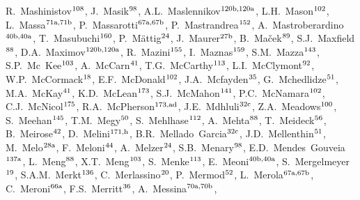 \begin{flushleft}
R.~Mashinistov$^\textrm{\scriptsize 108}$,    
J.~Masik$^\textrm{\scriptsize 98}$,    
A.L.~Maslennikov$^\textrm{\scriptsize 120b,120a}$,    
L.H.~Mason$^\textrm{\scriptsize 102}$,    
L.~Massa$^\textrm{\scriptsize 71a,71b}$,    
P.~Massarotti$^\textrm{\scriptsize 67a,67b}$,    
P.~Mastrandrea$^\textrm{\scriptsize 152}$,    
A.~Mastroberardino$^\textrm{\scriptsize 40b,40a}$,    
T.~Masubuchi$^\textrm{\scriptsize 160}$,    
P.~M\"attig$^\textrm{\scriptsize 24}$,    
J.~Maurer$^\textrm{\scriptsize 27b}$,    
B.~Ma\v{c}ek$^\textrm{\scriptsize 89}$,    
S.J.~Maxfield$^\textrm{\scriptsize 88}$,    
D.A.~Maximov$^\textrm{\scriptsize 120b,120a}$,    
R.~Mazini$^\textrm{\scriptsize 155}$,    
I.~Maznas$^\textrm{\scriptsize 159}$,    
S.M.~Mazza$^\textrm{\scriptsize 143}$,    
S.P.~Mc~Kee$^\textrm{\scriptsize 103}$,    
A.~McCarn$^\textrm{\scriptsize 41}$,    
T.G.~McCarthy$^\textrm{\scriptsize 113}$,    
L.I.~McClymont$^\textrm{\scriptsize 92}$,    
W.P.~McCormack$^\textrm{\scriptsize 18}$,    
E.F.~McDonald$^\textrm{\scriptsize 102}$,    
J.A.~Mcfayden$^\textrm{\scriptsize 35}$,    
G.~Mchedlidze$^\textrm{\scriptsize 51}$,    
M.A.~McKay$^\textrm{\scriptsize 41}$,    
K.D.~McLean$^\textrm{\scriptsize 173}$,    
S.J.~McMahon$^\textrm{\scriptsize 141}$,    
P.C.~McNamara$^\textrm{\scriptsize 102}$,    
C.J.~McNicol$^\textrm{\scriptsize 175}$,    
R.A.~McPherson$^\textrm{\scriptsize 173,ad}$,    
J.E.~Mdhluli$^\textrm{\scriptsize 32c}$,    
Z.A.~Meadows$^\textrm{\scriptsize 100}$,    
S.~Meehan$^\textrm{\scriptsize 145}$,    
T.M.~Megy$^\textrm{\scriptsize 50}$,    
S.~Mehlhase$^\textrm{\scriptsize 112}$,    
A.~Mehta$^\textrm{\scriptsize 88}$,    
T.~Meideck$^\textrm{\scriptsize 56}$,    
B.~Meirose$^\textrm{\scriptsize 42}$,    
D.~Melini$^\textrm{\scriptsize 171,h}$,    
B.R.~Mellado~Garcia$^\textrm{\scriptsize 32c}$,    
J.D.~Mellenthin$^\textrm{\scriptsize 51}$,    
M.~Melo$^\textrm{\scriptsize 28a}$,    
F.~Meloni$^\textrm{\scriptsize 44}$,    
A.~Melzer$^\textrm{\scriptsize 24}$,    
S.B.~Menary$^\textrm{\scriptsize 98}$,    
E.D.~Mendes~Gouveia$^\textrm{\scriptsize 137a}$,    
L.~Meng$^\textrm{\scriptsize 88}$,    
X.T.~Meng$^\textrm{\scriptsize 103}$,    
S.~Menke$^\textrm{\scriptsize 113}$,    
E.~Meoni$^\textrm{\scriptsize 40b,40a}$,    
S.~Mergelmeyer$^\textrm{\scriptsize 19}$,    
S.A.M.~Merkt$^\textrm{\scriptsize 136}$,    
C.~Merlassino$^\textrm{\scriptsize 20}$,    
P.~Mermod$^\textrm{\scriptsize 52}$,    
L.~Merola$^\textrm{\scriptsize 67a,67b}$,    
C.~Meroni$^\textrm{\scriptsize 66a}$,    
F.S.~Merritt$^\textrm{\scriptsize 36}$,    
A.~Messina$^\textrm{\scriptsize 70a,70b}$,    

\end{flushleft}
